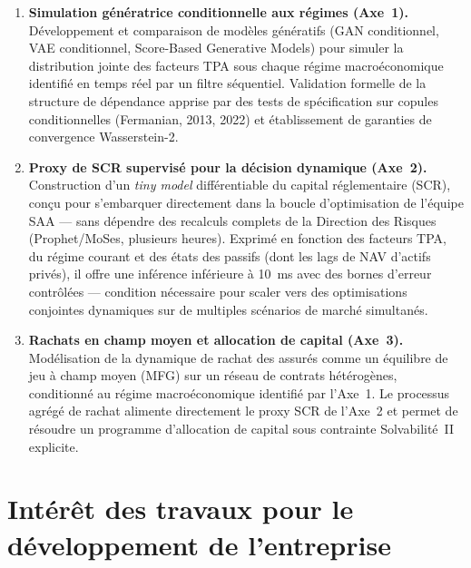 \documentclass[10pt,a4paper]{article}
\begin{document}
\begin{enumerate}[leftmargin=2em,itemsep=4pt]
  \item \textbf{Simulation génératrice conditionnelle aux régimes (Axe~1).}
        Développement et comparaison de modèles génératifs
        (GAN conditionnel, VAE conditionnel, Score-Based Generative Models)
        pour simuler la distribution jointe des facteurs TPA sous chaque régime
        macroéconomique identifié en temps réel par un filtre séquentiel.
        Validation formelle de la structure de dépendance apprise par des tests
        de spécification sur copules conditionnelles (Fermanian, 2013, 2022)
        et établissement de garanties de convergence Wasserstein-2.

  \item \textbf{Proxy de SCR supervisé pour la décision dynamique (Axe~2).}
        Construction d'un \textit{tiny model} différentiable du capital
        réglementaire (SCR), conçu pour s'embarquer directement dans la boucle
        d'optimisation de l'équipe SAA --- sans dépendre des recalculs complets
        de la Direction des Risques (Prophet/MoSes, plusieurs heures).
        Exprimé en fonction des facteurs TPA, du régime courant et des états
        des passifs (dont les lags de NAV d'actifs privés), il offre une
        inférence inférieure à 10~ms avec des bornes d'erreur contrôlées ---
        condition nécessaire pour scaler vers des optimisations conjointes
        dynamiques sur de multiples scénarios de marché simultanés.

  \item \textbf{Rachats en champ moyen et allocation de capital (Axe~3).}
        Modélisation de la dynamique de rachat des assurés comme un équilibre
        de jeu à champ moyen (MFG) sur un réseau de contrats hétérogènes,
        conditionné au régime macroéconomique identifié par l'Axe~1.
        Le processus agrégé de rachat alimente directement le proxy SCR de l'Axe~2
        et permet de résoudre un programme d'allocation de capital sous contrainte
        Solvabilité~II explicite.
\end{enumerate}

\section{Intérêt des travaux pour le développement de l'entreprise}
\end{document}
